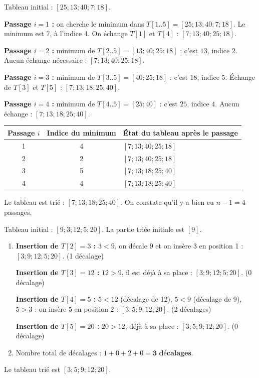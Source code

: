 \documentclass[11pt]{article}
\begin{document}
\begin{corrige}
Tableau initial : $[25 ; 13 ; 40 ; 7 ; 18]$.

\textbf{Passage $i = 1$ :} on cherche le minimum dans $T[1..5] = [25 ; 13 ; 40 ; 7 ; 18]$. Le minimum est $7$, à l'indice $4$. On échange $T[1]$ et $T[4]$ : $[7 ; 13 ; 40 ; 25 ; 18]$.

\textbf{Passage $i = 2$ :} minimum de $T[2..5] = [13 ; 40 ; 25 ; 18]$ : c'est $13$, indice $2$. Aucun échange nécessaire : $[7 ; 13 ; 40 ; 25 ; 18]$.

\textbf{Passage $i = 3$ :} minimum de $T[3..5] = [40 ; 25 ; 18]$ : c'est $18$, indice $5$. Échange de $T[3]$ et $T[5]$ : $[7 ; 13 ; 18 ; 25 ; 40]$.

\textbf{Passage $i = 4$ :} minimum de $T[4..5] = [25 ; 40]$ : c'est $25$, indice $4$. Aucun échange : $[7 ; 13 ; 18 ; 25 ; 40]$.

\begin{center}
\begin{tabular}{|c|c|l|}
\hline
\rowcolor{popblueL} Passage $i$ & Indice du minimum & État du tableau après le passage \\
\hline
1 & 4 & $[7 ; 13 ; 40 ; 25 ; 18]$ \\
\hline
2 & 2 & $[7 ; 13 ; 40 ; 25 ; 18]$ \\
\hline
3 & 5 & $[7 ; 13 ; 18 ; 25 ; 40]$ \\
\hline
4 & 4 & $[7 ; 13 ; 18 ; 25 ; 40]$ \\
\hline
\end{tabular}
\end{center}

Le tableau est trié : $[7 ; 13 ; 18 ; 25 ; 40]$. On constate qu'il y a bien eu $n - 1 = 4$ passages.
\end{corrige}

\begin{corrige}
Tableau initial : $[9 ; 3 ; 12 ; 5 ; 20]$. La partie triée initiale est $[9]$.

\begin{enumerate}
\item \textbf{Insertion de $T[2] = 3$ :} $3 < 9$, on décale $9$ et on insère $3$ en position 1 : $[3 ; 9 ; 12 ; 5 ; 20]$. (1 décalage)

\textbf{Insertion de $T[3] = 12$ :} $12 > 9$, il est déjà à sa place : $[3 ; 9 ; 12 ; 5 ; 20]$. (0 décalage)

\textbf{Insertion de $T[4] = 5$ :} $5 < 12$ (décalage de 12), $5 < 9$ (décalage de 9), $5 > 3$ : on insère $5$ en position 2 : $[3 ; 5 ; 9 ; 12 ; 20]$. (2 décalages)

\textbf{Insertion de $T[5] = 20$ :} $20 > 12$, déjà à sa place : $[3 ; 5 ; 9 ; 12 ; 20]$. (0 décalage)

\item Nombre total de décalages : $1 + 0 + 2 + 0 = \textbf{3 décalages}$.
\end{enumerate}
Le tableau trié est $[3 ; 5 ; 9 ; 12 ; 20]$.
\end{corrige}
\end{document}
